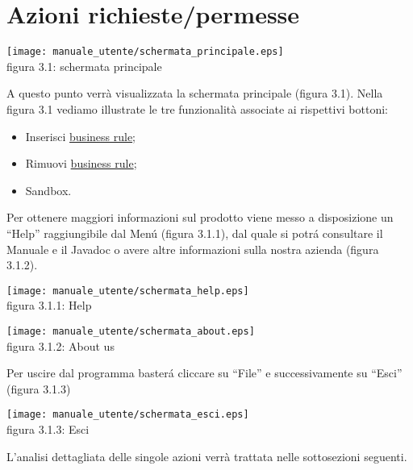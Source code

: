 \section{Azioni richieste/permesse}
\begin{center}
\texttt{[image: manuale\_utente/schermata\_principale.eps]}\\
 figura 3.1: schermata principale
\end{center}
A questo punto verr\`a visualizzata la schermata principale (figura 3.1).
Nella figura 3.1 vediamo illustrate le tre funzionalit\`a associate ai rispettivi bottoni:
\begin{itemize}
\item Inserisci \underline{business rule};
\item Rimuovi \underline{business rule};
\item Sandbox.
\end{itemize}
Per ottenere maggiori informazioni sul prodotto viene messo a disposizione un ``Help'' raggiungibile dal Men\'u (figura 3.1.1), dal quale si potr\'a consultare il Manuale e il Javadoc o avere altre informazioni sulla nostra azienda (figura 3.1.2).
\begin{center}
\texttt{[image: manuale\_utente/schermata\_help.eps]}\\
 figura 3.1.1: Help
\end{center}

\begin{center}
\texttt{[image: manuale\_utente/schermata\_about.eps]}\\
 figura 3.1.2: About us
\end{center}
Per uscire dal programma baster\'a cliccare su ``File'' e successivamente su ``Esci'' (figura 3.1.3) 
\begin{center}
\texttt{[image: manuale\_utente/schermata\_esci.eps]}\\
 figura 3.1.3: Esci
\end{center}
L'analisi dettagliata delle singole azioni verr\`a trattata nelle sottosezioni seguenti.
